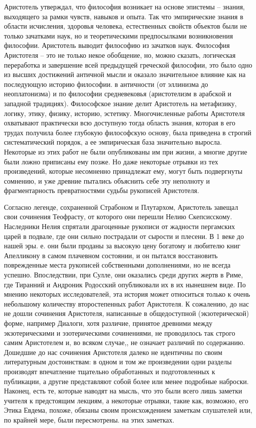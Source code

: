 \documentclass[
]{article}
\begin{document}
Аристотель утверждал, что философия возникает на основе эпистемы --
знания, выходящего за рамки чувств, навыков и опыта. Так что
эмпирические знания в области исчисления, здоровья человека,
естественных свойств объектов были не только зачатками наук, но и
теоретическими предпосылками возникновения философии. Аристотель выводит
философию из зачатков наук. Философия Аристотеля -- это не только некое
обобщение, но, можно сказать, логическая переработка и завершение всей
предыдущей греческой философии, это было одно из высших достижений
античной мысли и оказало значительное влияние как на последующую историю
философии. в античности (от эллинизма до неоплатонизма) и по философии
средневековья (аристотелизм в арабской и западной традициях).
Философское знание делит Аристотель на метафизику, логику, этику,
физику, историю, эстетику. Многочисленные работы Аристотеля охватывают
практически всю доступную тогда область знания, которая в его трудах
получила более глубокую философскую основу, была приведена в строгий
систематический порядок, а ее эмпирическая база значительно выросла.
Некоторые из этих работ не были опубликованы им при жизни, а многие
другие были ложно приписаны ему позже. Но даже некоторые отрывки из тех
произведений, которые несомненно принадлежат ему, могут быть подвергнуты
сомнению, и уже древние пытались объяснить себе эту неполноту и
фрагментарность превратностями судьбы рукописей Аристотеля.

Согласно легенде, сохраненной Страбоном и Плутархом, Аристотель завещал
свои сочинения Теофрасту, от которого они перешли Нелию Скепсисскому.
Наследники Нелия спрятали драгоценные рукописи от жадности пергамских
царей в подвале, где они сильно пострадали от сырости и плесени. В 1
веке до нашей эры. е. они были проданы за высокую цену богатому и
любителю книг Апелликону в самом плачевном состоянии, и он пытался
восстановить поврежденные места рукописей собственными дополнениями, но
не всегда успешно. Впоследствии, при Сулле, они оказались среди других
жертв в Риме, где Тиранний и Андроник Родосский опубликовали их в их
нынешнем виде. По мнению некоторых исследователей, эта история может
относиться только к очень небольшому количеству второстепенных работ
Аристотеля. К сожалению, до нас не дошли сочинения Аристотеля,
написанные в общедоступной (экзотерической) форме, например Диалоги,
хотя различие, принятое древними между экзотерическими и эзотерическими
сочинениями, не проводилось так строго самим Аристотелем и, во всяком
случае,, не означает различий по содержанию. Дошедшие до нас сочинения
Аристотеля далеко не идентичны по своим литературным достоинствам: в
одном и том же произведении одни разделы производят впечатление
тщательно обработанных и подготовленных к публикации, а другие
представляют собой более или менее подробные наброски. Наконец, есть те,
которые наводят на мысль, что это были всего лишь заметки учителя к
предстоящим лекциям, а некоторые отрывки, такие как, возможно, его Этика
Евдема, похоже, обязаны своим происхождением заметкам слушателей или, по
крайней мере, были пересмотрены. на этих заметках.
\end{document}
